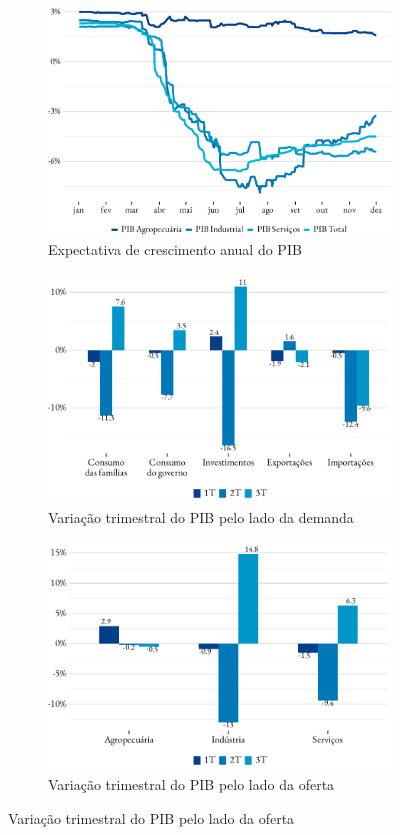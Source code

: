 \begin{figure}[!h]
	\begin{subfigure}{\linewidth}
		\caption{Expectativa de crescimento anual do PIB}
		\includegraphics{fig/pib_expec-1.pdf}
	\end{subfigure}
	\begin{subfigure}{\linewidth}
		\caption{Variação trimestral do PIB pelo lado da demanda}
		\includegraphics{fig/pib_demanda.pdf}
	\end{subfigure}
	\begin{subfigure}{\linewidth}
		\caption{Variação trimestral do PIB pelo lado da oferta}
		\includegraphics{fig/pib_oferta.pdf}

\end{subfigure}
\end{figure}
